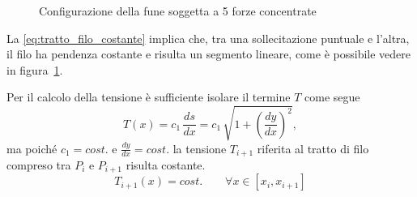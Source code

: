 \begin{figure}
  \centering
  

\caption{Configurazione della fune soggetta a 5 forze concentrate}
\label{fig:fune_forze_concentrate}
   
\end{figure}

La \eqref{eq:tratto_filo_costante} implica che, tra una sollecitazione puntuale e l'altra, il filo ha pendenza costante e risulta un segmento lineare, come è possibile vedere in figura~\ref{fig:fune_forze_concentrate}.

Per il calcolo della tensione è sufficiente isolare il termine $T$ come segue
\[
T(x) = c_1\,\dfrac{ds}{dx} = c_1\,\sqrt{1+\left(\dfrac{dy}{dx}\right)^2},
\]
ma poiché $c_1 = cost.$ e $\frac{dy}{dx} = cost.$ la tensione $T_{i+1}$ riferita al tratto di filo compreso tra $P_i$ e $P_{i+1}$ risulta costante.
\begin{equation}
\label{eq:tensione_costante}
T_{i+1}(x) = cost.\qquad \forall x \in [x_i, x_{i+1}]
\end{equation}

